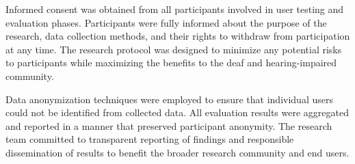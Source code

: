 \documentclass[12pt]{article}
\begin{document}
Informed consent was obtained from all participants involved in user testing and evaluation phases. Participants were fully informed about the purpose of the research, data collection methods, and their rights to withdraw from participation at any time. The research protocol was designed to minimize any potential risks to participants while maximizing the benefits to the deaf and hearing-impaired community.

Data anonymization techniques were employed to ensure that individual users could not be identified from collected data. All evaluation results were aggregated and reported in a manner that preserved participant anonymity. The research team committed to transparent reporting of findings and responsible dissemination of results to benefit the broader research community and end users.
\end{document}
